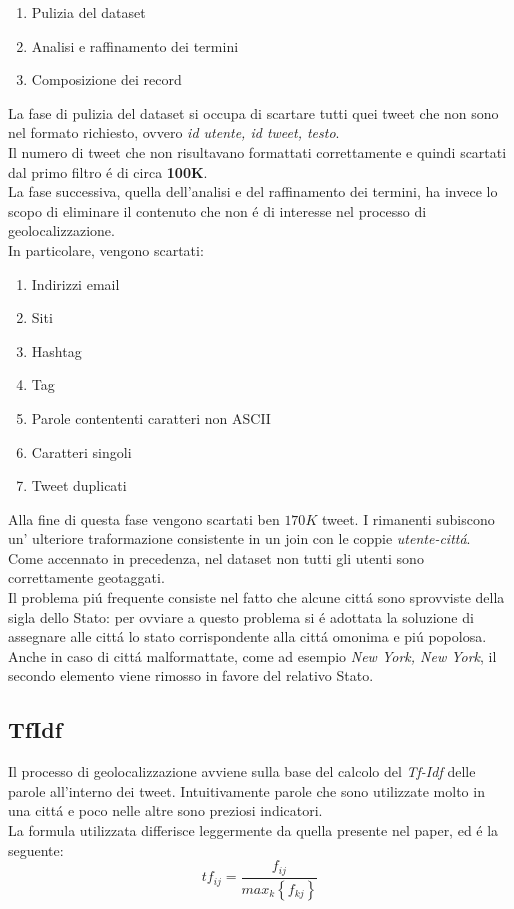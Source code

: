 \documentclass[twocolumn,10pt]{asme2ej}
\begin{document}
\begin{enumerate}
\item Pulizia del dataset
\item Analisi e raffinamento dei termini
\item Composizione dei record 
\end{enumerate}


La fase di pulizia del dataset si occupa di scartare tutti quei tweet che non sono nel formato richiesto, ovvero \textit{id utente, id tweet, testo}. \\Il numero di tweet che non risultavano formattati correttamente e quindi scartati dal primo filtro \'e di circa \textbf{100K}.\\La fase successiva, quella dell'analisi e del raffinamento dei termini, ha invece lo scopo di eliminare il contenuto che non \'e di interesse nel processo di geolocalizzazione. \\In particolare, vengono scartati:
\begin{enumerate}
\item Indirizzi email 
\item Siti
\item Hashtag
\item Tag
\item Parole contententi caratteri non ASCII
\item Caratteri singoli
\item Tweet duplicati
\end{enumerate}

Alla fine di questa fase vengono scartati ben $170K$ tweet. I rimanenti subiscono un' ulteriore traformazione consistente in un join con  le coppie \textit{utente-citt\'a}. \\Come accennato in precedenza, nel dataset non tutti gli utenti sono correttamente geotaggati.\\ Il problema pi\'u frequente consiste nel fatto che alcune citt\'a sono sprovviste della sigla dello Stato: per ovviare a questo problema si \'e adottata la soluzione di assegnare alle citt\'a lo stato corrispondente alla citt\'a omonima e pi\'u popolosa. Anche in caso di citt\'a malformattate, come ad esempio  \textit{New York, New York}, il secondo elemento viene rimosso in favore del relativo Stato. 

\subsection{TfIdf}

Il processo di geolocalizzazione avviene sulla base del calcolo del \textit{Tf-Idf} delle parole all'interno dei tweet. Intuitivamente parole che sono utilizzate molto in una citt\'a e poco nelle altre sono  preziosi indicatori. \\La formula utilizzata differisce leggermente da quella presente nel paper, ed \'e la seguente: $$tf_{ij}=	\frac{f_{ij}}{max_k	\left \{ f_{kj} \right \}	}$$
\end{document}
